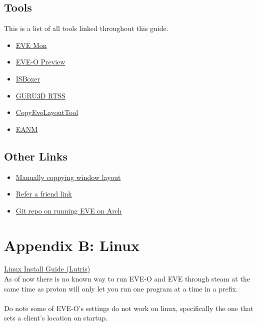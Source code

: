 \documentclass{article}
\begin{document}
\subsection*{Tools}
This is a list of all tools linked throughout this guide.
\begin{itemize}
  \item \href{https://evemondevteam.github.io/evemon/}{EVE Mon}
  \item \href{https://github.com/Proopai/eve-o-preview}{EVE-O Preview}
  \item \href{https://isboxer.com/}{ISBoxer}
  \item \href{https://www.guru3d.com/download/rtss-rivatuner-statistics-server-download}{GURU3D RTSS}
  \item \href{https://github.com/kshannoninnes/CopyEveLayoutTool}{CopyEveLayoutTool}
  \item \href{URLhttps://github.com/FontaineRiant/EANM}{EANM}
\end{itemize}

\subsection*{Other Links}
\begin{itemize}
  \item \href{https://forums.eveonline.com/t/manually-copy-settings-between-characters-and-accounts/32704}{Manually coppying window layout}
  \item \href{https://www.eveonline.com/signup?invc=79ffb3de-ef43-400b-a568-e45ac72c6715}{Refer a friend link}
  \item \href{https://gist.github.com/arillat/2b7e519a69268f519d507d0ed50b9713}{Git repo on running EVE on Arch}
\end{itemize}

\section*{Appendix B: Linux}
\href{https://www.reddit.com/r/Eve/comments/1hqjm4a/linux_lutris_eve_online_eveo_preview/}{Linux Install Guide (Lutris)}\\
As of now there is no known way to run EVE-O and EVE through steam at the same time as proton will only let you run one program 
at a time in a prefix.
\\
\\
Do note some of EVE-O's settings do not work on linux, specifically the one that sets a client's location on startup.
\end{document}
